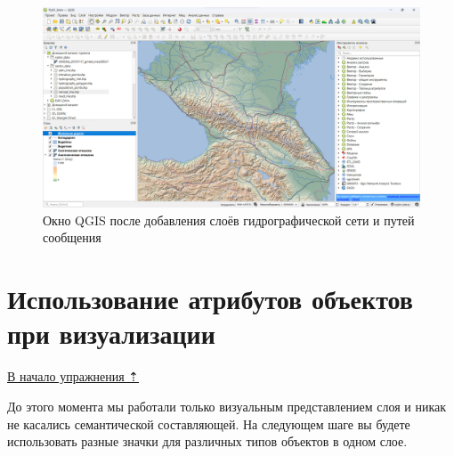 \documentclass[
  12pt,
]{book}
\begin{document}
\begin{figure}
\centering
\includegraphics{images/Ex01_MapGeneral/screen_qgis_water_roads.png}
\caption{Окно QGIS после добавления слоёв гидрографической сети и путей сообщения}
\end{figure}

\hypertarget{map-design-general-attributes}{%
\section{Использование атрибутов объектов при визуализации}\label{map-design-general-attributes}}

\protect\hyperlink{map-design-general}{В начало упражнения ⇡}

До этого момента мы работали только визуальным представлением слоя и никак не касались семантической составляющей. На следующем шаге вы будете использовать разные значки для различных типов объектов в одном слое.
\end{document}
